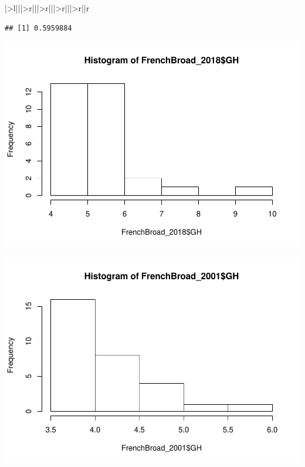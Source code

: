 \documentclass[
  12pt,
]{article}
\newenvironment{Shaded}{\begin{snugshade}}{\end{snugshade}}
\newcommand{\FunctionTok}[1]{\textcolor[rgb]{0.00,0.00,0.00}{#1}}
\newcommand{\NormalTok}[1]{#1}
\newcommand{\SpecialCharTok}[1]{\textcolor[rgb]{0.00,0.00,0.00}{#1}}
\begin{document}
\begin{table}
\begin{tabular}[t]{|>{}l|||>{}r|||>{}r|||>{}r|||>{}r||r}
\begin{verbatim}
## [1] 0.5959884
\end{verbatim}

\begin{Shaded}
\end{Shaded}

\includegraphics{Project_Template_files/figure-latex/T-Test-4.pdf}

\begin{Shaded}
\end{Shaded}

\includegraphics{Project_Template_files/figure-latex/T-Test-5.pdf}


\end{tabular}
\end{table}
\end{document}
